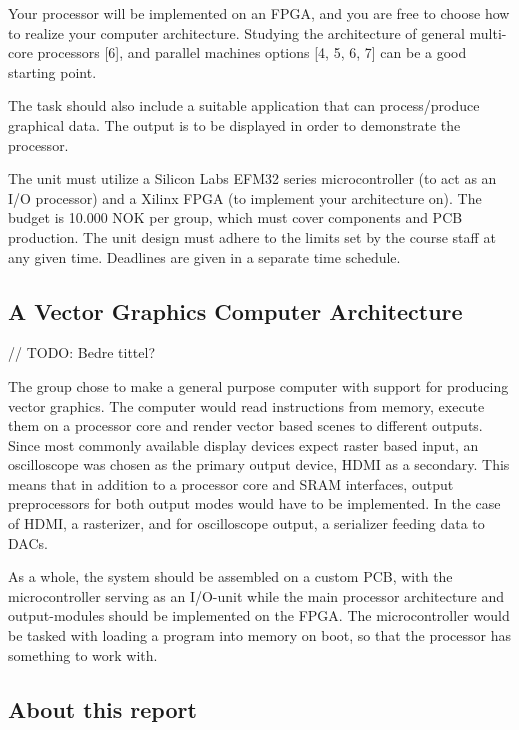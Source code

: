 Your processor will be implemented on an FPGA, and you are free to choose how to realize your computer architecture.
Studying the architecture of general multi-core processors [6], and parallel machines options [4, 5, 6, 7] can be a good starting point.


The task should also include a suitable application that can process/produce graphical data.
The output is to be displayed in order to demonstrate the processor.

The unit must utilize a Silicon Labs EFM32 series microcontroller (to act as an I/O processor) and a Xilinx FPGA (to implement your architecture on).
The budget is 10.000 NOK per group, which must cover components and PCB production.
The unit design must adhere to the limits set by the course staff at any given time.
Deadlines are given in a separate time schedule.

\subsection{A Vector Graphics Computer Architecture}

// TODO: Bedre tittel?

The group chose to make a general purpose computer with support for producing vector graphics.
The computer would read instructions from memory, execute them on a processor core and render vector based scenes to different outputs.
Since most commonly available display devices expect raster based input, an oscilloscope was chosen as the primary output device, HDMI as a secondary.
This means that in addition to a processor core and SRAM interfaces, output preprocessors for both output modes would have to be implemented.
In the case of HDMI, a rasterizer, and for oscilloscope output, a serializer feeding data to DACs.

As a whole, the system should be assembled on a custom PCB, with the microcontroller serving as an I/O-unit while the main processor architecture and output-modules should be implemented on the FPGA.
The microcontroller would be tasked with loading a program into memory on boot, so that the processor has something to work with.


\subsection{About this report}


